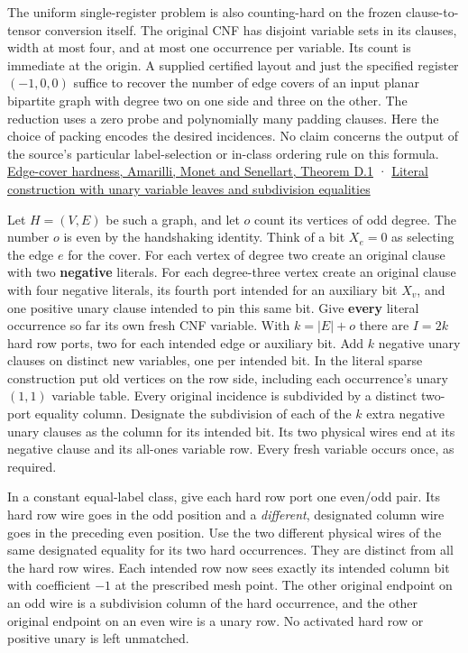 \documentclass[
  11pt,
]{article}
\begin{document}
The uniform single-register problem is also counting-hard on the frozen
clause-to-tensor conversion itself. The original CNF has disjoint
variable sets in its clauses, width at most four, and at most one
occurrence per variable. Its count is immediate at the origin. A
supplied certified layout and just the specified register \((-1,0,0)\)
suffice to recover the number of edge covers of an input planar
bipartite graph with degree two on one side and three on the other. The
reduction uses a zero probe and polynomially many padding clauses. Here
the choice of packing encodes the desired incidences. No claim concerns
the output of the source's particular label-selection or in-class
ordering rule on this formula.
\href{https://pierre.senellart.com/publications/amarilli2017conjunctive.pdf}{Edge-cover
hardness, Amarilli, Monet and Senellart, Theorem D.1} ·
\href{https://github.com/openai/math/blob/main/preprints/The-Exponential-Time-Hypothesis-is-False-October-25-2026/build/quantitative-reduction.tex\#L65}{Literal
construction with unary variable leaves and subdivision equalities}

Let \(H=(V,E)\) be such a graph, and let \(o\) count its vertices of odd
degree. The number \(o\) is even by the handshaking identity. Think of a
bit \(X_e=0\) as selecting the edge \(e\) for the cover. For each vertex
of degree two create an original clause with two \textbf{negative}
literals. For each degree-three vertex create an original clause with
four negative literals, its fourth port intended for an auxiliary bit
\(X_v\), and one positive unary clause intended to pin this same bit.
Give \textbf{every} literal occurrence so far its own fresh CNF
variable. With \(k=|E|+o\) there are \(I=2k\) hard row ports, two for
each intended edge or auxiliary bit. Add \(k\) negative unary clauses on
distinct new variables, one per intended bit. In the literal sparse
construction put old vertices on the row side, including each
occurrence's unary \((1,1)\) variable table. Every original incidence is
subdivided by a distinct two-port equality column. Designate the
subdivision of each of the \(k\) extra negative unary clauses as the
column for its intended bit. Its two physical wires end at its negative
clause and its all-ones variable row. Every fresh variable occurs once,
as required.

In a constant equal-label class, give each hard row port one even/odd
pair. Its hard row wire goes in the odd position and a \emph{different},
designated column wire goes in the preceding even position. Use the two
different physical wires of the same designated equality for its two
hard occurrences. They are distinct from all the hard row wires. Each
intended row now sees exactly its intended column bit with coefficient
\(-1\) at the prescribed mesh point. The other original endpoint on an
odd wire is a subdivision column of the hard occurrence, and the other
original endpoint on an even wire is a unary row. No activated hard row
or positive unary is left unmatched.
\end{document}
